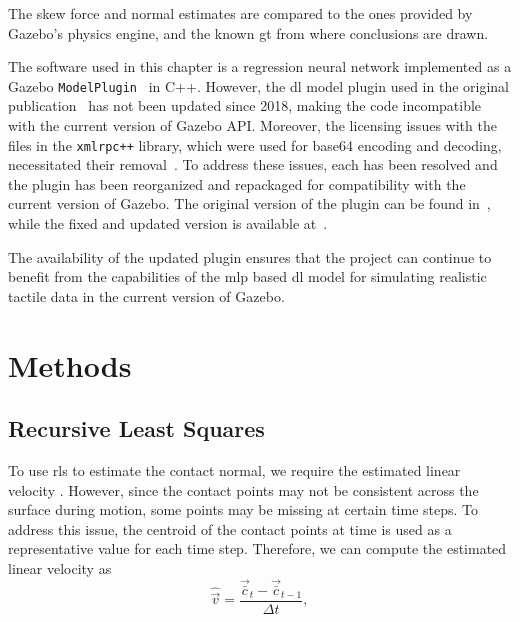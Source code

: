 The skew force and normal estimates are compared to the ones provided by Gazebo's physics engine, and the known \gls{gt} from where conclusions are drawn. \medskip

The software used in this chapter is a regression neural network implemented as a Gazebo \texttt{ModelPlugin}~\cite{gazebo-model-plugin} in C++. However, the \gls{dl} model plugin used in the original publication~\cite{simulation-of-the-syntouch-biotac-sensor} has not been updated since \num{2018}, making the code incompatible with the current version of Gazebo API. Moreover, the licensing issues with the files in the \texttt{xmlrpc++} library, which were used for base64 encoding and decoding, necessitated their removal~\cite{base64-encoding-decoding-licensing-issue}. To address these issues, each has been resolved and the plugin has been reorganized and repackaged for compatibility with the current version of Gazebo. The original version of the plugin can be found in~\cite{ruppel-philipp-biotac-gazebo-plugin}, while the fixed and updated version is available at~\cite{melbye-staven-biotac-sim-plugin}. \medskip

The availability of the updated plugin ensures that the project can continue to benefit from the capabilities of the \gls{mlp} based \gls{dl} model for simulating realistic tactile data in the current version of Gazebo.

\section{Methods}\label{sec:1-tactile-perception-method}

\subsection{Recursive Least Squares}\label{sec:1-tactile-perception-recirsive-least-squares}

To use \gls{rls} to estimate the contact normal, we require the estimated linear velocity . However, since the contact points may not be consistent across the surface during motion, some points may be missing at certain time steps. To address this issue, the centroid of the contact points  at time  is used as a representative value for each time step. Therefore, we can compute the estimated linear velocity as 
%
\begin{equation} \label{eq:v-estimate}
	\hat{\vec{v}} = \frac{\vec{\bar{c}}_{t} - \vec{\bar{c}}_{t-1}}{\Delta t},
\end{equation}

